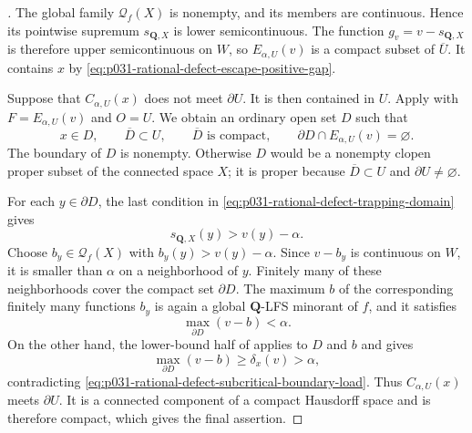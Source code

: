 \begin{proof}[]
The global family $\mathcal Q_f(X)$ is nonempty, and its members are
continuous.  Hence its pointwise supremum $s_{\mathbf Q,X}$ is lower
semicontinuous.  The function $g_v=v-s_{\mathbf Q,X}$ is therefore upper
semicontinuous on $W$, so $E_{\alpha,U}(v)$ is a compact subset of
$\overline U$.  It contains $x$ by
\eqref{eq:p031-rational-defect-escape-positive-gap}.

Suppose that $C_{\alpha,U}(x)$ does not meet $\partial U$.  It is then
contained in $U$.  Apply  with
$F=E_{\alpha,U}(v)$ and $O=U$.  We obtain an ordinary open set $D$ such
that
\begin{equation}
\label{eq:p031-rational-defect-trapping-domain}
 x\in D,\qquad \overline D\subset U,\qquad
 \overline D\text{ is compact},\qquad
 \partial D\cap E_{\alpha,U}(v)=\varnothing.
\end{equation}
The boundary of $D$ is nonempty.  Otherwise $D$ would be a nonempty clopen
proper subset of the connected space $X$; it is proper because
$\overline D\subset U$ and $\partial U\ne\varnothing$.

For each $y\in\partial D$, the last condition in
\eqref{eq:p031-rational-defect-trapping-domain} gives
\[
                    s_{\mathbf Q,X}(y)>v(y)-\alpha.
\]
Choose $b_y\in\mathcal Q_f(X)$ with $b_y(y)>v(y)-\alpha$.  Since
$v-b_y$ is continuous on $W$, it is smaller than $\alpha$ on a neighborhood
of $y$.  Finitely many of these
neighborhoods cover the compact set $\partial D$.  The maximum $b$ of the
corresponding finitely many functions $b_y$ is again a global
$\mathbf Q$-LFS minorant of $f$, and it satisfies
\begin{equation}
\label{eq:p031-rational-defect-subcritical-boundary-load}
                         \max_{\partial D}(v-b)<\alpha.
\end{equation}
On the other hand, the lower-bound half of
 applies to $D$ and $b$ and gives
\[
             \max_{\partial D}(v-b)\geq\delta_x(v)>\alpha,
\]
contradicting
\eqref{eq:p031-rational-defect-subcritical-boundary-load}.  Thus
$C_{\alpha,U}(x)$ meets $\partial U$.  It is a connected component of a
compact Hausdorff space and is therefore compact, which gives the final
assertion.
\end{proof}

